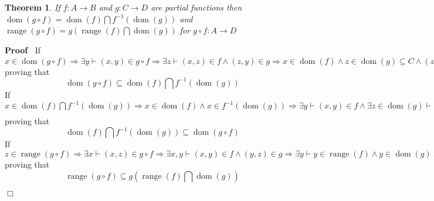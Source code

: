 \documentclass{book}
\newcommand{\Rightarrowlim}{\mathop{\rightarrow}\limits}
\newcommand{\tmop}[1]{\ensuremath{\operatorname{#1}}}
\newenvironment{proof}{\noindent\textbf{Proof\ }}{\hspace*{\fill}$\Box$\medskip}
\newtheorem{theorem}{Theorem}
\begin{document}
{{\begin{theorem}
  \label{dom and range of a composition of partial functions}If $f : A
  \rightarrow B$ and $g : C \rightarrow D$ are partial functions then
  $\tmop{dom} (g \circ f) = \tmop{dom} (f) \bigcap f^{- 1} (\tmop{dom} (g))$
  and $\tmop{range} (g \circ f) = g \left( \tmop{range} (f) \bigcap \tmop{dom}
  (g) \right)$ for $g \circ f : A \rightarrow D$
\end{theorem}

\begin{proof}
  If $x \in \tmop{dom} (g \circ f) \Rightarrow \exists y \vdash (x, y) \in g
  \circ f \Rightarrow \exists z \vdash (x, z) \in f \wedge (z, y) \in g
  \Rightarrow x \in \tmop{dom} (f) \wedge z \in \tmop{dom} (g) \subseteq C
  \wedge (z, y) \in g \wedge (x, z) \in f \Rightarrow x \in \tmop{dom} (f)
  \wedge x \in f^{- 1} (\tmop{dom} (g)) \Rightarrow x \in \tmop{dom} (f)
  \bigcap f^{- 1} (\tmop{dom} (g))$ proving that
  \begin{equation}
    \label{eq 0.2.1} \tmop{dom} (g \circ f) \subseteq \tmop{dom} (f) \bigcap
    f^{- 1} (\tmop{dom} (g))
  \end{equation}
  If $x \in \tmop{dom} (f) \bigcap f^{- 1} (\tmop{dom} (g)) \Rightarrow x \in
  \tmop{dom} (f) \wedge x \in f^{- 1} (\tmop{dom} (g)) \Rightarrow \exists y
  \vdash (x, y) \in f \wedge \exists z \in \tmop{dom} (g) \vdash (x, z) \in f
  \Rightarrowlim_{f \tmop{is} a \tmop{partial} \tmop{function} \Rightarrow y =
  z} \exists y \vdash (x, y) \in f \wedge y \in \tmop{dom} (g) \Rightarrow
  \exists w, y \vdash (x, y) \in f \wedge (y, w) \in g \Rightarrow \exists w
  \vdash (x, w) \in g \circ f \Rightarrow x \in \tmop{dom} (g \circ f)$
  proving that
  \begin{equation}
    \label{eq 0.2.2} \tmop{dom} (f) \bigcap f^{- 1} (\tmop{dom} (g)) \subseteq
    \tmop{dom} (g \circ f)
  \end{equation}
  If $z \in \tmop{range} (g \circ f) \Rightarrow \exists x \vdash (x, z) \in g
  \circ f \Rightarrow \exists x, y \vdash (x, y) \in f \wedge (y, z) \in g
  \Rightarrow \exists y \vdash y \in \tmop{range} (f) \wedge y \in \tmop{dom}
  (g) \wedge (y, z) \in g \Rightarrow \exists y \vdash y \in \tmop{range} (f)
  \bigcap \tmop{dom} (g) \wedge (y, z) \in g \Rightarrow z \in g \left(
  \tmop{range} (f) \bigcap \tmop{dom} (g) \right)$ proving that
  \begin{equation}
    \label{eq 0.2.3} \tmop{range} (g \circ f) \subseteq g \left( \tmop{range}
    (f) \bigcap \tmop{dom} (g) \right)
  \end{equation}

\end{proof}}}
\end{document}
